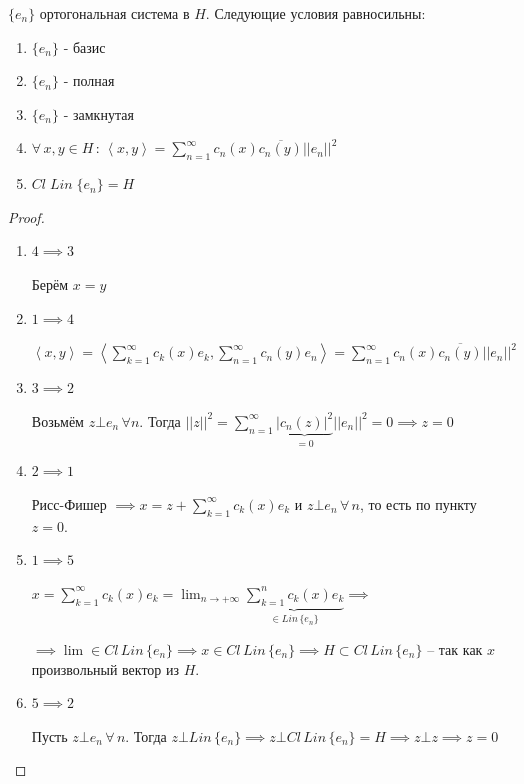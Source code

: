 \begin{theorem}
    $\{ e_n \}$ ортогональная система в $H$. Следующие условия равносильны:

    \begin{enumerate}
        \item $\{ e_n \}$ - базис
        \item $\{ e_n \}$ - полная
        \item $\{ e_n \}$ - замкнутая
        \item $\forall \, x, y \in H \, : \, \left < x, y \right > = \sum_{n = 1}^\infty c_n (x) \overline{c_n (y)} ||e_n||^2$
        \item $Cl \; Lin \; \{ e_n \} = H$
    \end{enumerate}
\end{theorem}

\begin{proof}
    \begin{enumerate}
        \item {
            $4 \implies 3$

            Берём $x = y$
        }
        \item {
            $1 \implies 4$

            $\left < x, y \right > = \left < \sum_{k = 1}^\infty c_k(x) e_k, \sum_{n = 1}^\infty c_n (y) e_n \right > = \sum_{n = 1}^\infty c_n(x) \overline{c_n(y)} ||e_n||^2$
        }
        \item {
            $3 \implies 2$

            Возьмём $z \bot e_n \, \forall n$. Тогда $||z||^2 = \sum_{n = 1}^\infty \underbrace{|c_n (z)|^2}_{= 0} ||e_n||^2 = 0 \implies z = 0$
        }
        \item {
            $2 \implies 1$

            Рисс-Фишер $\implies x = z + \sum_{k = 1}^\infty c_k (x) e_k$ и $z \bot e_n \, \forall \, n$, то есть по пункту $z=0$.
        }
        \item {
            $1 \implies 5$

            $x = \sum_{k = 1}^\infty c_k (x) e_k = \lim_{n \to +\infty} \underbrace{\sum_{k = 1}^n c_k (x) e_k}_{\in Lin \, \{ e_n \}} \implies$

            $\implies \lim \in Cl \, Lin \, \{ e_n \} \implies x \in Cl \, Lin \, \{ e_n \} \implies H \subset Cl \, Lin \, \{ e_n \}$ -- так как $x$ произвольный вектор из $H$.
        }
        \item {
            $5 \implies 2$

            Пусть $z \bot e_n \, \forall \, n$. Тогда $z \bot Lin \, \{ e_n \} \implies z \bot Cl \, Lin \, \{ e_n \} = H \implies z \bot z \implies z = 0$
        }
    \end{enumerate}
\end{proof}

